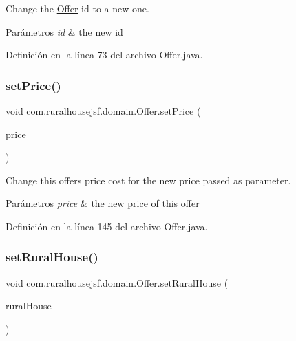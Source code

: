 Change the \mbox{\hyperlink{classcom_1_1ruralhousejsf_1_1domain_1_1_offer}{Offer}} id to a new one. 


\begin{DoxyParams}{Parámetros}
{\em id} & the new id \\
\hline
\end{DoxyParams}


Definición en la línea 73 del archivo Offer.\+java.

\mbox{\label{classcom_1_1ruralhousejsf_1_1domain_1_1_offer_aaf77b7df1299a14ecc9cae2040dec6af}} 
\subsubsection{\texorpdfstring{setPrice()}{setPrice()}}
{\footnotesize\ttfamily void com.\+ruralhousejsf.\+domain.\+Offer.\+set\+Price (\begin{DoxyParamCaption}\item[{double}]{price }\end{DoxyParamCaption})}



Change this offers price cost for the new price passed as parameter. 


\begin{DoxyParams}{Parámetros}
{\em price} & the new price of this offer \\
\hline
\end{DoxyParams}


Definición en la línea 145 del archivo Offer.\+java.

\mbox{\label{classcom_1_1ruralhousejsf_1_1domain_1_1_offer_ab10c2d200d23aff2383f720b1dcecd02}} 
\subsubsection{\texorpdfstring{setRuralHouse()}{setRuralHouse()}}
{\footnotesize\ttfamily void com.\+ruralhousejsf.\+domain.\+Offer.\+set\+Rural\+House (\begin{DoxyParamCaption}\item[{\mbox{\hyperlink{classcom_1_1ruralhousejsf_1_1domain_1_1_rural_house}{Rural\+House}}}]{rural\+House }\end{DoxyParamCaption})}



